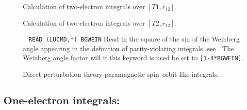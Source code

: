 \begin{description}
\item[] Calculation of two-electron integrals over
  $\left[T1,r_{12}\right]$.

\item[] Calculation of two-electron integrals over
  $\left[T2,r_{12}\right]$.

\item[]\verb| |\newline
\verb|READ (LUCMD,*) BGWEIN|\newline
Read in the square of the sin of the Weinberg angle appearing in the
definition of parity-violating integrals, see . The
Weinberg angle factor will if this keyword is used be set to
\verb|[1-4*BGWEIN]|. 

\item[] Direct perturbation theory paramagnetic
  spin--orbit like integrals. 


\end{description}


\subsection{One-electron integrals: }
\label{sec:oneinp}

